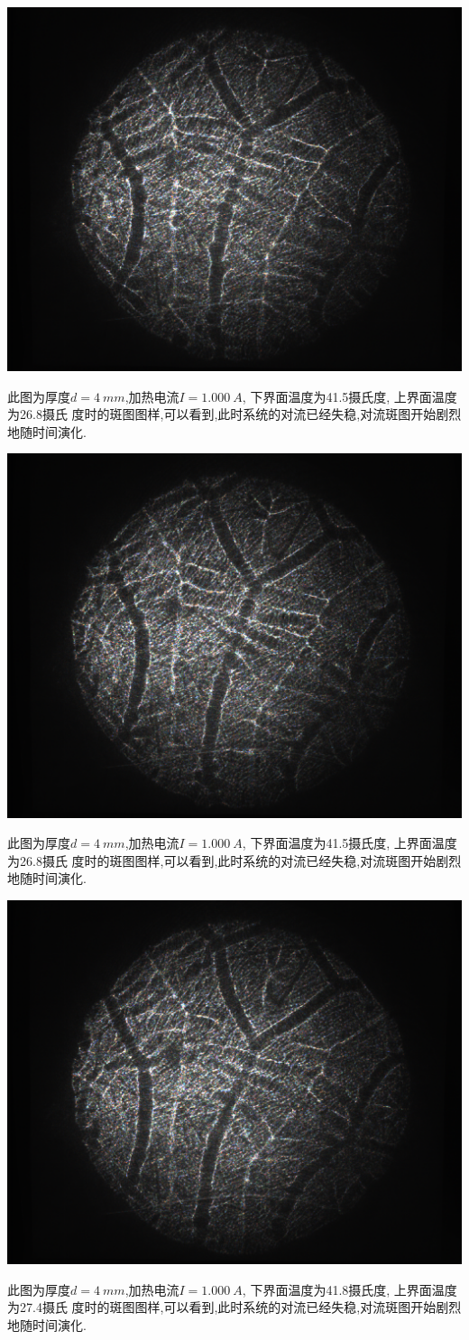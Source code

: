 \documentclass[aps,pre,12pt,preprint,onecolumn,showpacs,showkeys,floatfix]{revtex4-1}
\begin{document}
\begin{center}
    \includegraphics[width=.5\textwidth]{5.20/15.pdf}
\end{center}
    此图为厚度$d=\SI{4}{mm}$,加热电流$I=\SI{1.000}{A}$, 下界面温度为41.5摄氏度,
    上界面温度为26.8摄氏
    度时的斑图图样,可以看到,此时系统的对流已经失稳,对流斑图开始剧烈地随时间演化.

\begin{center}
    \includegraphics[width=.5\textwidth]{5.20/16.pdf}
\end{center}
    此图为厚度$d=\SI{4}{mm}$,加热电流$I=\SI{1.000}{A}$, 下界面温度为41.5摄氏度,
    上界面温度为26.8摄氏
    度时的斑图图样,可以看到,此时系统的对流已经失稳,对流斑图开始剧烈地随时间演化.

\begin{center}
    \includegraphics[width=.5\textwidth]{5.20/17.pdf}
\end{center}
    此图为厚度$d=\SI{4}{mm}$,加热电流$I=\SI{1.000}{A}$, 下界面温度为41.8摄氏度,
    上界面温度为27.4摄氏
    度时的斑图图样,可以看到,此时系统的对流已经失稳,对流斑图开始剧烈地随时间演化.
\end{document}

